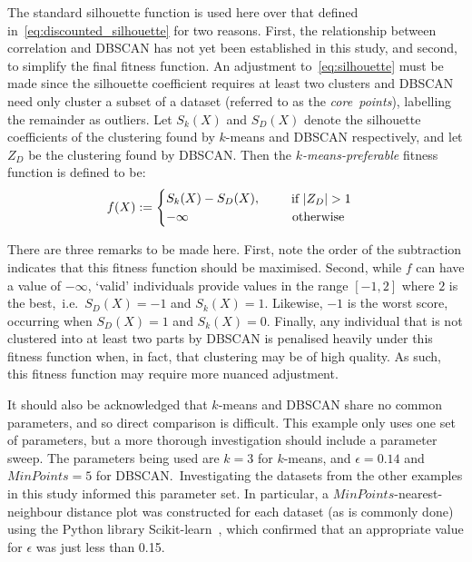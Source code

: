 The standard silhouette function is used here over that defined
in~\eqref{eq:discounted_silhouette} for two reasons. First, the relationship
between correlation and DBSCAN has not yet been established in this study, and
second, to simplify the final fitness function. An adjustment
to~\eqref{eq:silhouette} must be made since the silhouette coefficient requires
at least two clusters and DBSCAN need only cluster a subset of a dataset
(referred to as the \emph{core~points}), labelling the remainder as outliers.
Let \(S_k (X)\) and \(S_D (X)\) denote the silhouette coefficients of the
clustering found by \(k\)-means and DBSCAN respectively, and let \(Z_D\) be the
clustering found by DBSCAN. Then the \emph{\(k\)-means-preferable} fitness
function is defined to be:
\begin{equation}\label{eq:kmeans_preferable}
    f(X) :=
        \begin{cases}
            S_k (X) - S_D (X), &\quad \text{%
                \begin{tabular}{l}%
                    if \(\left|Z_D\right| > 1\)
                \end{tabular}
            }\\
            - \infty &\quad \ \ \text{otherwise}
        \end{cases}
\end{equation}

There are three remarks to be made here. First, note the order of the
subtraction indicates that this fitness function should be maximised. Second,
while \(f\) can have a value of \(-\infty\), `valid' individuals provide values
in the range \([-1, 2]\) where \(2\) is the best,~i.e.\ \(S_D(X) = -1\) and
\(S_k(X) = 1\). Likewise, \(-1\) is the worst score, occurring when \(S_D(X)=1\)
and \(S_k(X) = 0\). Finally, any individual that is not clustered into at least
two parts by DBSCAN is penalised heavily under this fitness function when, in
fact, that clustering may be of high quality. As such, this fitness function may
require more nuanced adjustment.

It should also be acknowledged that \(k\)-means and DBSCAN share no common
parameters, and so direct comparison is difficult. This example only uses one
set of parameters, but a more thorough investigation should include a parameter
sweep. The parameters being used are \(k=3\) for \(k\)-means, and
\(\epsilon=0.14\) and \(MinPoints=5\) for DBSCAN.\ Investigating the datasets
from the other examples in this study informed this parameter set. In
particular, a \(MinPoints\)-nearest-neighbour distance plot was constructed for
each dataset (as is commonly done) using the Python library
Scikit-learn~\cite{scikit}, which confirmed that an appropriate value for
\(\epsilon\) was just less than 0.15.

